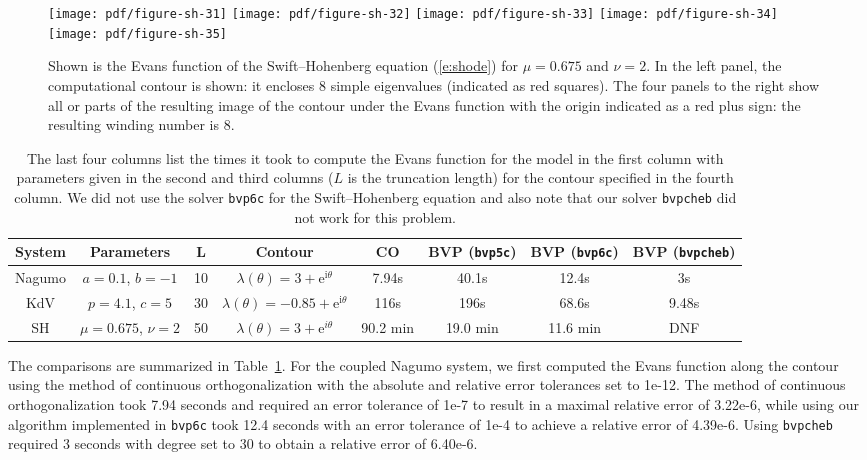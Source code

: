 \documentclass[10pt]{article}
\numberwithin{equation}{section}
\newcommand{\rme}{\mathrm{e}}
\newcommand{\rmi}{\mathrm{i}}
\begin{document}
\begin{figure}
\centering 
\texttt{[image: pdf/figure-sh-31]} 
\texttt{[image: pdf/figure-sh-32]} 
\texttt{[image: pdf/figure-sh-33]}
\texttt{[image: pdf/figure-sh-34]}
\texttt{[image: pdf/figure-sh-35]} 
\caption{Shown is the Evans function of the Swift--Hohenberg equation (\ref{e:shode}) for $\mu=0.675$ and $\nu=2$. In the left panel, the computational contour is shown: it encloses 8 simple eigenvalues (indicated as red squares). The four panels to the right show all or parts of the resulting image of the contour under the Evans function with the origin indicated as a red plus sign: the resulting winding number is 8.}
\label{f:sh3}
\end{figure}

\begin{table}
\begin{tabular}{|c|c|c|c|c|c|c|c|}\hline
System & Parameters & L & Contour & CO & BVP (\texttt{bvp5c}) & BVP (\texttt{bvp6c}) & BVP (\texttt{bvpcheb}) \\ \hline \hline
Nagumo & $a=0.1$, $b=-1$ & 10 & $\lambda(\theta)=3+\rme^{\rmi\theta}$ & 7.94s & 40.1s & 12.4s & 3s \\ \hline
KdV & $p=4.1$, $c=5$ & 30 & $\lambda(\theta)=-0.85+\rme^{\rmi\theta}$ & 116s & 196s & 68.6s & 9.48s \\ \hline
SH & $\mu=0.675$, $\nu=2$ & 50 & $\lambda(\theta)=3+\rme^{i\theta}$ & 90.2 min & 19.0 min& 11.6 min& DNF \\
\hline
\end{tabular}
\caption{The last four columns list the times it took to compute the Evans function for the model in the first column with parameters given in the second and third columns ($L$ is the truncation length) for the contour specified in the fourth column. We did not use the solver \texttt{bvp6c} for the Swift--Hohenberg equation and also note that our solver \texttt{bvpcheb} did not work for this problem.}
\label{tb_error}
\end{table}

The comparisons are summarized in Table~\ref{tb_error}. For the coupled Nagumo system, we first computed the Evans function along the contour using the method of continuous orthogonalization with the absolute and relative error tolerances set to 1e-12. The method of continuous orthogonalization took 7.94 seconds and required an error tolerance of 1e-7 to result in a maximal relative error of 3.22e-6, while using our algorithm implemented in \texttt{bvp6c} took 12.4 seconds with an error tolerance of 1e-4 to achieve a relative error of 4.39e-6. Using \texttt{bvpcheb} required 3 seconds with degree set to 30 to obtain a relative error of 6.40e-6.
\end{document}
